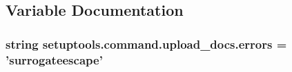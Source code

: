 \subsection{Variable Documentation}
\hypertarget{namespacesetuptools_1_1command_1_1upload__docs_a14cf254a0f90c25273da9635eadbc006}{}
\subsubsection[{errors}]{\setlength{\rightskip}{0pt plus 5cm}string setuptools.\+command.\+upload\+\_\+docs.\+errors = 'surrogateescape'}\label{namespacesetuptools_1_1command_1_1upload__docs_a14cf254a0f90c25273da9635eadbc006}
